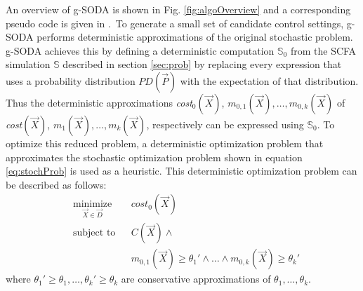 \documentclass[a4paper, 12pt]{article} %
\begin{document}
An overview of g-SODA is shown in Fig. \ref{fig:algoOverview} and a corresponding pseudo code is given in \algoSODAm.~To generate a small set of candidate control settings, g-SODA performs deterministic approximations of the original stochastic problem. 
g-SODA achieves this by defining a deterministic computation $\mathbb{S}_0$ from the SCFA simulation $\mathbb{S}$ described in section \ref{sec:prob} by replacing every expression that uses a probability distribution $PD(\vec{P})$ with the expectation of that distribution. 
Thus the deterministic approximations \textit{cost$_0$}$(\vec{X})$, $m_{0,1}(\vec{X}),\dots,m_{0,k}(\vec{X})$ of \textit{cost}$(\vec{X})$, $m_1(\vec{X}),\dots,m_k(\vec{X})$, respectively can be expressed using $\mathbb{S}_0$.
To optimize this reduced problem, a deterministic optimization problem that approximates the stochastic optimization problem shown in equation \ref{eq:stochProb} is used as a heuristic. This deterministic optimization problem can be described as follows:
\begin{equation}
\label{eq:detApprox}
\begin{aligned}
& \underset{\vec{X}\in\vec{D}}{\text{minimize}}
& & \textit{cost}_0(\vec{X}) \\
& \text{subject to}
& & C(\vec{X}) \wedge \\
&&& m_{0,1}(\vec{X})\ge  \theta_1{'}\wedge\dots \wedge m_{0,k}(\vec{X})\ge  \theta_k{'} 
\end{aligned}
\end{equation}
where $\theta_1{'} \ge \theta_1,\dots,\theta_k{'} \ge \theta_k$ are conservative approximations of $\theta_1,\dots,\theta_k$. 
\end{document}
